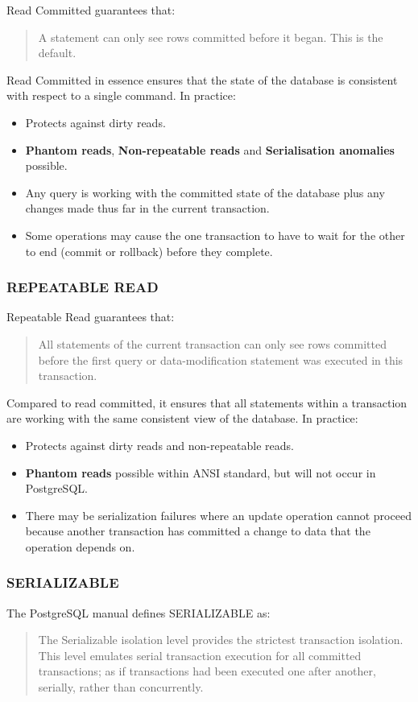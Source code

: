 \documentclass[slides]{pgnotes}
\begin{document}
Read Committed guarantees that:
\begin{quotation}
  A statement can only see rows committed before it began. This is the default.
\end{quotation}
Read Committed in essence ensures that the state of the database is consistent with respect to a single command. 
In practice:
\begin{itemize}
\item Protects against dirty reads.
\item \textbf{Phantom reads}, \textbf{Non-repeatable reads} and \textbf{Serialisation anomalies}  possible.
\item Any query is working with the committed state of the database plus any changes made thus far in the current transaction.
\item Some operations may cause the one transaction to have to wait for the other to end (commit or rollback) before they complete.
\end{itemize}

\subsubsection{REPEATABLE READ}

Repeatable Read guarantees that:
\begin{quotation}
  All statements of the current transaction can only see rows committed before the first query or data-modification statement was executed in this transaction.
\end{quotation}
Compared to read committed, it ensures that all statements within a transaction are working with the same consistent view of the database.
In practice:
\begin{itemize}
\item Protects against dirty reads and non-repeatable reads.
\item \textbf{Phantom reads} possible within ANSI standard, but will not occur in PostgreSQL.
\item There may be serialization failures where an update operation cannot proceed because another transaction has committed a change to data that the operation depends on.
\end{itemize}

\subsubsection{SERIALIZABLE}

The PostgreSQL manual defines SERIALIZABLE as:
\begin{quotation}
  The Serializable isolation level provides the strictest transaction isolation. This level emulates serial transaction execution for all committed transactions; as if transactions had been executed one after another, serially, rather than concurrently.
\end{quotation}


\end{document}
